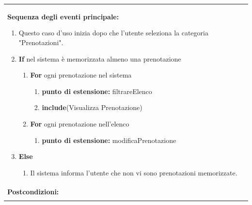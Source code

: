 \documentclass{article}
\begin{document}
\begin{table}[H]
\begin{tabular}{|p{\linewidth}|}
\begin{minipage}{\linewidth}
                        \end{minipage}
                        \vspace{0pt} \\
                        \hline
                        \textbf{Sequenza degli eventi principale:}
                        \begin{enumerate}
                            \item Questo caso d'uso inizia dopo che l'utente seleziona la categoria "Prenotazioni".
                            \item \textbf{If} nel sistema è memorizzata almeno una prenotazione
                            \begin{enumerate}
                                \item \textbf{For} ogni prenotazione nel sistema
                                \begin{enumerate}
                                    \item[] \textbf{punto di estensione:} filtrareElenco
                                    \item \textbf{include}(Visualizza Prenotazione)
                                \end{enumerate}
                                \item \textbf{For} ogni prenotazione nell'elenco
                                \begin{enumerate}
                                    \item[] \textbf{punto di estensione:} modificaPrenotazione
                                \end{enumerate}
                            \end{enumerate}
                            \item \textbf{Else}
                            \begin{enumerate}
                                \item Il sistema informa l'utente che non vi sono prenotazioni memorizzate.
                            \end{enumerate}
                        \end{enumerate} \\
                        \hline
                        \cellcolor{gray!20}
                        \textbf{Postcondizioni:} \\
                        \cellcolor{gray!20}
                        \begin{minipage}{\linewidth}

\end{minipage}
\end{tabular}
\end{table}
\end{document}
